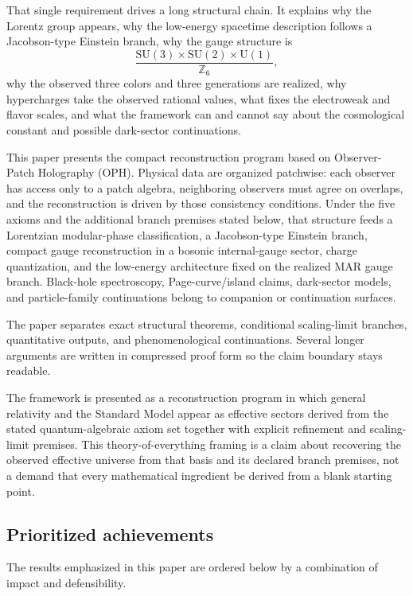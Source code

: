 \documentclass[11pt]{article}
\newcommand{\SU}{\mathrm{SU}}
\newcommand{\U}{\mathrm{U}}
\begin{document}
That single requirement drives a long structural chain. It explains why the Lorentz group appears, why the low-energy spacetime description follows a Jacobson-type Einstein branch, why the gauge structure is
\[
\frac{\SU(3)\times\SU(2)\times\U(1)}{\mathbb Z_6},
\]
why the observed three colors and three generations are realized, why hypercharges take the observed rational values, what fixes the electroweak and flavor scales, and what the framework can and cannot say about the cosmological constant and possible dark-sector continuations.

This paper presents the compact reconstruction program based on Observer-Patch Holography (OPH).
Physical data are organized patchwise: each observer has access only to a patch algebra,
neighboring observers must agree on overlaps, and the reconstruction is driven by those
consistency conditions. Under the five axioms and the additional branch premises stated below,
that structure feeds a Lorentzian modular-phase classification, a Jacobson-type Einstein branch,
compact gauge reconstruction in a bosonic internal-gauge sector, charge quantization, and the
low-energy architecture fixed on the realized MAR gauge branch.
Black-hole spectroscopy, Page-curve/island claims, dark-sector models, and particle-family
continuations belong to companion or continuation surfaces.

The paper separates exact structural theorems, conditional scaling-limit branches, quantitative outputs, and phenomenological continuations. Several longer arguments are written in compressed proof form so the claim boundary stays readable.

The framework is presented as a reconstruction program in which general relativity and the Standard Model appear as effective sectors derived from the stated quantum-algebraic axiom set together with explicit refinement and scaling-limit premises. This theory-of-everything framing is a claim about recovering the observed effective universe from that basis and its declared branch premises, not a demand that every mathematical ingredient be derived from a blank starting point.

\subsection*{Prioritized achievements}

The results emphasized in this paper are ordered below by a combination of impact and defensibility.
\end{document}
